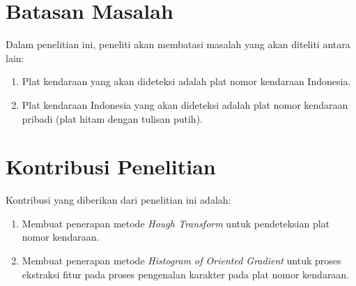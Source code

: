 \section{Batasan Masalah}
\noindent Dalam penelitian ini, peneliti akan membatasi masalah yang akan diteliti antara lain:
\begin{enumerate}[nolistsep,leftmargin=0.5cm]
\item Plat kendaraan yang akan dideteksi adalah plat nomor kendaraan Indonesia.
\item Plat kendaraan Indonesia yang akan dideteksi adalah plat nomor kendaraan pribadi (plat hitam dengan tulisan putih).\\ 
\end{enumerate}

\section{Kontribusi Penelitian}
\noindent Kontribusi yang diberikan dari penelitian ini adalah:

\begin{enumerate}[nolistsep,leftmargin=0.5cm]
\item Membuat penerapan metode \textit{Hough Transform} untuk pendeteksian plat nomor kendaraan.
\item Membuat penerapan metode \textit{Histogram of Oriented Gradient} untuk proses ekstraksi fitur pada proses pengenalan karakter pada plat nomor kendaraan.\\
\end{enumerate}

